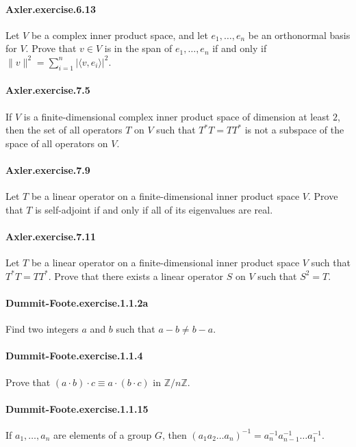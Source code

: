 \documentclass{article}
\begin{document}
\paragraph{Axler.exercise.6.13} Let $V$ be a complex inner product space, and let $e_1, \dots, e_n$ be an orthonormal basis for $V$. Prove that $v\in V$ is in the span of $e_1, \dots, e_n$ if and only if $\|v\|^2 = \sum_{i=1}^n |\langle v, e_i\rangle|^2$.

\paragraph{Axler.exercise.7.5} If $V$ is a finite-dimensional complex inner product space of dimension at least $2$, then the set of all operators $T$ on $V$ such that $T^*T=TT^*$ is not a subspace of the space of all operators on $V$.

\paragraph{Axler.exercise.7.9} Let $T$ be a linear operator on a finite-dimensional inner product space $V$. Prove that $T$ is self-adjoint if and only if all of its eigenvalues are real.

\paragraph{Axler.exercise.7.11} Let $T$ be a linear operator on a finite-dimensional inner product space $V$ such that $T^*T=TT^*$. Prove that there exists a linear operator $S$ on $V$ such that $S^2=T$.

\paragraph{Dummit-Foote.exercise.1.1.2a} Find two integers $a$ and $b$ such that $a-b\neq b-a$.

\paragraph{Dummit-Foote.exercise.1.1.4} Prove that $(a\cdot b)\cdot c \equiv a\cdot (b\cdot c)$ in $\mathbb{Z}/n\mathbb{Z}$.

\paragraph{Dummit-Foote.exercise.1.1.15} If $a_1, \dots, a_n$ are elements of a group $G$, then $(a_1a_2\dots a_n)^{-1} = a_n^{-1}a_{n-1}^{-1}\dots a_1^{-1}$.
\end{document}
